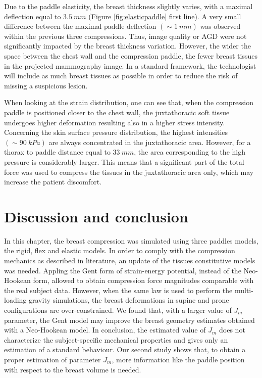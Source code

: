 Due to the paddle elasticity, the breast thickness slightly varies, with a maximal deflection equal to $3.5\ mm$ (Figure \ref{fig:elasticpaddle} first line). A very small difference between the maximal paddle deflection  $(\sim 1\ mm)$ was observed within the previous three compressions. Thus, image quality or AGD were not significantly impacted by the breast thickness variation. However, the wider the space between the chest wall and the compression paddle, the fewer breast tissues in the projected mammography image. In a standard framework, the technologist will include as much breast tissues as possible in order to reduce the risk of missing a suspicious lesion.

When looking at the strain distribution, one can see that, when the compression paddle is positioned closer to the chest wall, the juxtathoracic soft tissue undergoes higher deformation resulting also in a higher stress intensity. Concerning the skin surface pressure distribution, the highest intensities $ (\sim 90\ kPa)$ are always concentrated in the juxtathoracic area. However, for a thorax to paddle distance equal to $33\ mm$, the area corresponding to the high pressure is considerably larger. This means that a significant part of the total force was  used to compress the tissues in the juxtathoracic area only, which may increase the patient discomfort.

\section{Discussion and conclusion}\label{section:compressionfem:conclusion}

In this chapter, the breast compression was simulated using three paddles models, the rigid, flex and elastic models. In order to comply with the compression mechanics as described in literature, an update of the tissues constitutive models was needed. Appling the Gent form of strain-energy potential, instead of the Neo-Hookean form, allowed to obtain compression force magnitudes comparable with the real subject data. However, when the same law is used to perform the multi-loading gravity simulations, the breast deformations in supine and prone configurations are over-constrained. We found that, with a larger value of $J_m$ parameter, the Gent model may improve the breast geometry estimates obtained with a Neo-Hookean model.
In conclusion, the estimated value of $J_m$ does not characterize the subject-specific mechanical properties and gives only an estimation of a standard behaviour.  Our second study shows that, to obtain a proper estimation of parameter $J_m$, more information like the paddle position with respect to the breast volume is needed. 


